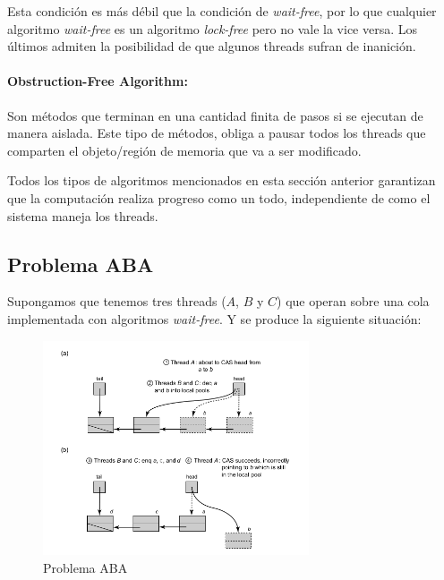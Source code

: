 Esta condición es más débil que la condición de \textit{wait-free}, por lo que cualquier algoritmo \textit{wait-free} es un algoritmo \textit{lock-free} pero no vale la vice versa. Los últimos admiten la posibilidad de que algunos threads sufran de inanición.

\paragraph{Obstruction-Free Algorithm:} Son métodos que terminan en una cantidad finita de pasos si se ejecutan de manera aislada. Este tipo de métodos, obliga a pausar todos los threads que comparten el objeto/región de memoria que va a ser modificado.

\vspace*{0.5cm}
Todos los tipos de algoritmos mencionados en esta sección anterior garantizan que la computación realiza progreso como un todo, independiente de como el sistema maneja los threads.

\subsection{Problema ABA}
Supongamos que tenemos tres threads ($A$, $B$ y $C$) que operan sobre una cola implementada con algoritmos \textit{wait-free}. Y se produce la siguiente situación:

\begin{figure}[H]
	\centering
	\includegraphics[width=0.7\textwidth]{imagenes/aba-problem}
	\caption{Problema ABA}
	\label{fig:aba-problem}
\end{figure}

